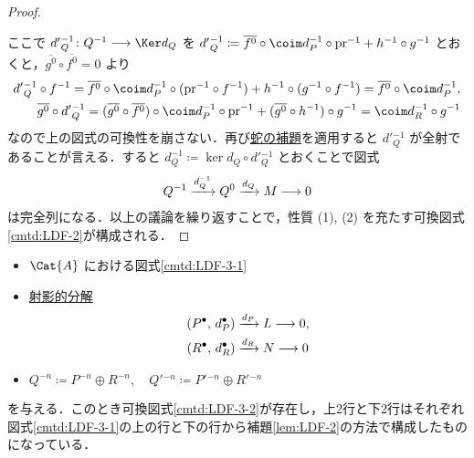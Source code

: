 \documentclass[algtopo_main]{subfiles}
\begin{document}
\begin{proof}
    \begin{figure}[H]
        \centering
    \end{figure}%

    ここで $d'{}^{-1}_Q \colon Q^{-1} \lto \Ker d_Q$ を $d'{}^{-1}_Q \coloneqq \overline{f^0} \circ \coim d_P^{-1} \circ \mathrm{pr}^{-1} + h^{-1} \circ g^{-1}$ とおくと，$\overline{g^0} \circ \overline{f^0} = 0$ より
    \begin{align}
        d'{}^{-1}_Q \circ f^{-1} = \overline{f^0} \circ \coim d_P^{-1} \circ (\mathrm{pr}^{-1} \circ f^{-1}) + h^{-1} \circ (g^{-1} \circ f^{-1}) = \overline{f^0} \circ \coim d_P^{-1}, \\
        \overline{g^0} \circ d'{}^{-1}_Q = (\overline{g^0} \circ \overline{f^0}) \circ \coim d_P^{-1} \circ \mathrm{pr}^{-1} + (\overline{g^0} \circ h^{-1}) \circ g^{-1} = \coim d_R^{-1} \circ g^{-1}
    \end{align}
    なので上の図式の可換性を崩さない．再び\hyperref[thm:snake]{蛇の補題}を適用すると $d'{}^{-1}_Q$ が全射であることが言える．すると $d_Q^{-1} \coloneqq \ker d_Q \circ d'{}^{-1}_Q$ とおくことで図式
    \begin{align}
        Q^{-1} \xrightarrow{d_Q^{-1}} Q^0 \xrightarrow{d_Q} M \longrightarrow 0
    \end{align}
    は完全列になる．以上の議論を繰り返すことで，性質 (1), (2) を充たす可換図式\ref{cmtd:LDF-2}が構成される．
\end{proof}

\begin{mycol}[label=col:LDF-3-3]{}
    \begin{itemize}
        \item $\Cat{A}$ における図式\ref{cmtd:LDF-3-1}
        \item \hyperref[def:projective-resolution]{射影的分解}
        \begin{align}
            (P^\bullet,\, d_P^\bullet)&\xrightarrow{d_P} L \longrightarrow 0,\\
            (R^\bullet,\, d_R^\bullet)&\xrightarrow{d_R} N \longrightarrow 0
        \end{align}
        \item $Q^{-n} \coloneqq P^{-n} \oplus R^{-n},\quad Q'{}^{-n} \coloneqq P'{}^{-n} \oplus R'{}^{-n}$
    \end{itemize}
    を与える．このとき可換図式\ref{cmtd:LDF-3-2}が存在し，上2行と下2行はそれぞれ図式\ref{cmtd:LDF-3-1}の上の行と下の行から補題\ref{lem:LDF-2}の方法で構成したものになっている．
\end{mycol}
\end{document}
